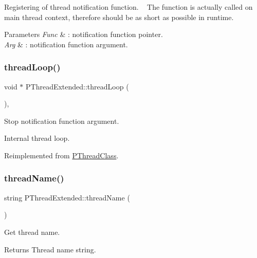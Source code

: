 Registering of thread notification function. ~\newline
 The function is actually called on main thread context, therefore should be as short as possible in runtime. 
\begin{DoxyParams}{Parameters}
{\em Func} & \+: notification function pointer. \\
\hline
{\em Arg} & \+: notification function argument. \\
\hline
\end{DoxyParams}
\mbox{\label{classPThreadExtended_a43d31ca653ffe314e400a48a77f8e0a9}} 
\subsubsection{\texorpdfstring{thread\+Loop()}{threadLoop()}}
{\footnotesize\ttfamily void $\ast$ P\+Thread\+Extended\+::thread\+Loop (\begin{DoxyParamCaption}{ }\end{DoxyParamCaption})\hspace{0.3cm}{\ttfamily [private]}, {\ttfamily [virtual]}}



Stop notification function argument. 

Internal thread loop. 

Reimplemented from \hyperlink{classPThreadClass_a77732762f14058291d35bdbbc49018c6}{P\+Thread\+Class}.

\mbox{\label{classPThreadExtended_a3c49f906e273860f45c44b5a988cf139}} 
\subsubsection{\texorpdfstring{thread\+Name()}{threadName()}}
{\footnotesize\ttfamily string P\+Thread\+Extended\+::thread\+Name (\begin{DoxyParamCaption}{ }\end{DoxyParamCaption})\hspace{0.3cm}{\ttfamily [inline]}}

Get thread name. \begin{DoxyReturn}{Returns}
Thread name string. 
\end{DoxyReturn}


